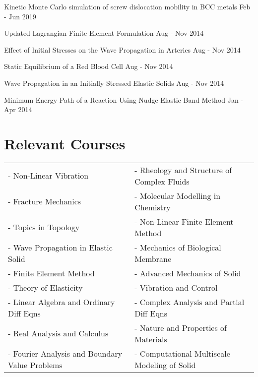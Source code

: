 \documentclass[margin,line]{resume}
\begin{document}
\begin{resume}
    Kinetic Monte Carlo simulation of screw dislocation mobility in BCC metals  \hfill \small{Feb - Jun 2019}

    \vspace{-0.3cm}
    Updated Lagrangian Finite Element Formulation  \hfill \small{Aug - Nov 2014}

    \vspace{-0.3cm}
    Effect of Initial Stresses on the Wave Propagation in Arteries \hfill \small{Aug - Nov 2014}

    \vspace{-0.3cm}
    Static Equilibrium of a Red Blood Cell \hfill \small{Aug - Nov 2014}

    \vspace{-0.3cm}
    Wave Propagation in an Initially Stressed Elastic Solids \hfill \small{Aug - Nov 2014}

    \vspace{-0.3cm}
    Minimum Energy Path of a Reaction Using Nudge Elastic Band Method \hfill \small{Jan - Apr 2014}




    \section{\mysidestyle Relevant Courses}

    \begin{tabular}{@{}p{7.5cm}p{7.5cm}}
        - Non-Linear Vibration                         & -	Rheology and Structure of Complex Fluids    \\
        - Fracture Mechanics                           & - Molecular Modelling in Chemistry           \\
        - Topics in Topology                           & - Non-Linear Finite Element Method           \\
        - Wave Propagation in Elastic Solid            & - Mechanics of Biological Membrane           \\
        - Finite Element Method                        & - Advanced Mechanics of Solid                \\
        - Theory of Elasticity                         & - Vibration and Control                      \\
        - Linear Algebra and Ordinary Diff Eqns        & - Complex Analysis and Partial Diff Eqns     \\
        - Real Analysis and Calculus                   & - Nature and Properties of Materials         \\
        - Fourier Analysis and Boundary Value Problems & - Computational Multiscale Modeling of Solid
    \end{tabular}


\end{resume}
\end{document}
